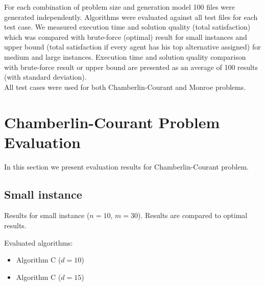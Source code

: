 For each combination of problem size and generation model 100 files were generated independently. Algorithms were evaluated against all test files for each test case. We measured execution time and solution quality (total satisfaction) which was compared with brute-force (optimal) result for small instances and upper bound (total satisfaction if every agent has his top alternative assigned) for medium and large instances. Execution time and solution quality comparison with brute-force result or upper bound are presented as an average of 100 results (with standard deviation).
\\

All test cases were used for both Chamberlin-Courant and Monroe problems.

\section{Chamberlin-Courant Problem Evaluation}

In this section we present evaluation results for Chamberlin-Courant problem.

\subsection{Small instance}

Results for small instance ($n = 10$, $m = 30$). Results are compared to optimal results.

Evaluated algorithms:

\begin{itemize}
	\item Algorithm C ($d = 10$)
	\item Algorithm C ($d = 15$)
\end{itemize}






